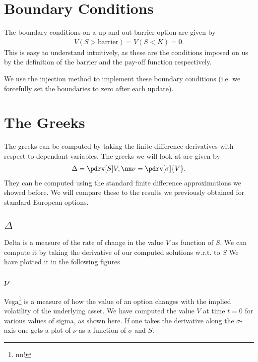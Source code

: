  \section{Boundary Conditions}
  The boundary conditions on a up-and-out barrier option are given by
  \begin{align}
    V(S > \text{barrier}) = V(S < K) = 0.
  \end{align}
  This is easy to understand intuitively, as these are the conditions imposed on us by the definition of the barrier and the pay-off function respectively.

  We use the injection method to implement these boundary conditions (i.e. we forcefully set the boundaries to zero after each update).

  \section{The Greeks}
  The greeks can be computed by taking the finite-difference derivatives with respect to dependant variables.
  The greeks we will look at are given by
  \begin{align}
    \Delta = \pdrv[S]V,\nn
    \nu = \pdrv[\sigma]{V}.
  \end{align}
  They can be computed using the standard finite difference approximations we showed before. We will compare these to the results we previously obtained for standard European options.
  \subsection{$\Delta$}
  Delta is a measure of the rate of change in the value $V$ as function of $S$. We can compute it by taking the derivative of our computed solutions w.r.t. to $S$
  We have plotted it in the following figures
  \subsection{$\nu$}
  Vega\footnote{nu!} is a measure of how the value of an option changes with the implied volatility of the underlying asset. We have computed the value $V$ at time $t=0$ for various
  values of sigma, as shown here.
  If one takes the derivative along the $\sigma$-axis one gets a plot of $\nu$ as a function of $\sigma$ and $S$.


